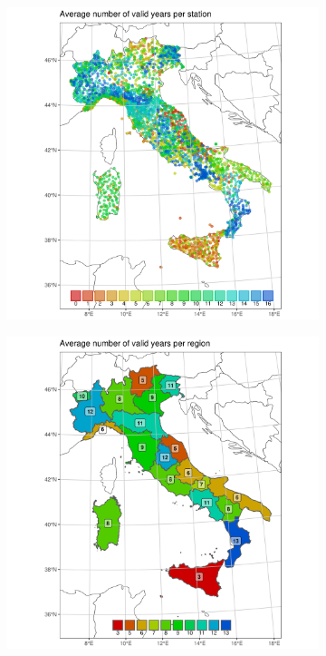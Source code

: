 \begin{figure}
    \centering
    \begin{subfigure}{.475\textwidth}
        \caption{}\label{fig:regional_stats/a}
        \includegraphics[width=\textwidth]{figures/rain_dst/regional_stats/plot.png}
    \end{subfigure}
    \begin{subfigure}{.475\textwidth}
        \caption{}\label{fig:regional_stats/b}
        \includegraphics[width=\textwidth]{figures/rain_dst/regional_stats/plot2.png}

\end{subfigure}
\end{figure}
